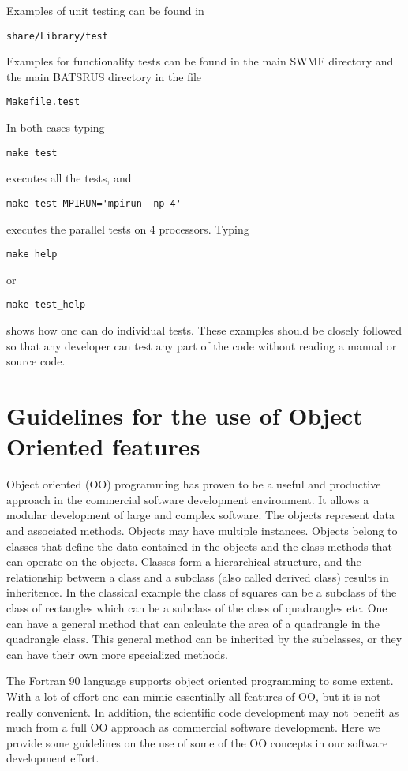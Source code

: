 \documentclass{article}
\begin{document}
Examples of unit testing can be found in 
\begin{verbatim}
share/Library/test
\end{verbatim}
Examples for functionality tests can be found in the main SWMF directory
and the main BATSRUS directory in the file
\begin{verbatim}
Makefile.test
\end{verbatim}
In both cases typing
\begin{verbatim}
make test
\end{verbatim}
executes all the tests, and
\begin{verbatim}
make test MPIRUN='mpirun -np 4'
\end{verbatim}
executes the parallel tests on 4 processors. Typing
\begin{verbatim}
make help
\end{verbatim}
or
\begin{verbatim}
make test_help
\end{verbatim}
shows how one can do individual tests. 
These examples should be closely followed so that any developer can test
any part of the code without reading a manual or source code.

\section{Guidelines for the use of Object Oriented features 
         \label{sec:object}}

Object oriented (OO) programming has proven to be a useful and productive 
approach in the commercial software development environment. It allows
a modular development of large and complex software. The objects 
represent data and associated methods. Objects may have multiple instances.
Objects belong to classes that define the data contained in the objects 
and the class methods that can operate on the objects. 
Classes form a hierarchical structure,
and the relationship between a class and a subclass (also called derived
class) results in inheritence.
In the classical example the class of squares can be a subclass of the
class of rectangles which can be a subclass of the class of quadrangles etc.
One can have a general method that can calculate the area of a 
quadrangle in the quadrangle class. This general method can be inherited
by the subclasses, or they can have their own more specialized methods.

The Fortran 90 language supports object oriented programming to some extent.
With a lot of effort one can mimic essentially all features of OO, but it is
not really convenient. In addition, the scientific code development 
may not benefit as much from a full OO approach as commercial software
development.
Here we provide some guidelines on the use of some of the OO concepts 
in our software development effort. 
\end{document}

